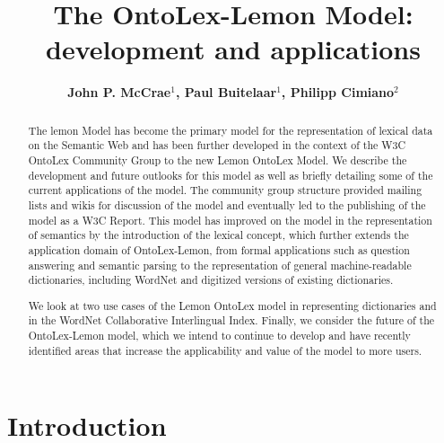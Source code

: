 \documentclass[12pt,a4paper]{elex2017}
\begin{document}
\mainmatter
\title{The OntoLex-Lemon Model: development and applications}
\author{\bf John P. McCrae$^1$, Paul Buitelaar$^1$, Philipp Cimiano$^{2}$}

\maketitle

\begin{abstract}
The lemon Model has become the primary
model for the representation of lexical data on the Semantic Web and has been
further developed in the context of the W3C OntoLex Community Group to the new
    Lemon OntoLex Model.
We describe the development and future outlooks for this model as well
as briefly detailing some of the current applications of the model. 
The community group structure provided mailing lists and wikis
for discussion of the model and eventually led to the publishing of the model as
a W3C Report. This model has improved on the model in the representation of
    semantics by the introduction of the lexical concept, which
further
extends the application domain of OntoLex-Lemon, from formal applications such
as question answering and semantic parsing to the representation of general
machine-readable dictionaries, including WordNet and digitized versions of
existing dictionaries.

We look at two use cases of the Lemon OntoLex model in representing dictionaries
and in the WordNet Collaborative Interlingual Index.
Finally, we consider the future of the OntoLex-Lemon model, which we intend to
continue to develop and have recently identified areas that
increase the applicability and value of the model to more users.

\end{abstract}



\section{Introduction}
\end{document}
